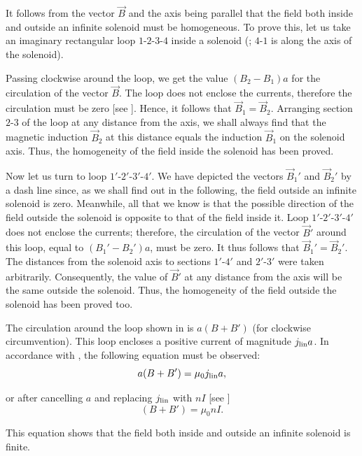 It follows from the vector $\vec{B}$ and the axis being parallel that the field both inside and outside an infinite solenoid must be homogeneous. To prove this, let us take an imaginary rectangular loop $1$-$2$-$3$-$4$ inside a solenoid (; $4$-$1$ is along the axis of the solenoid).

Passing clockwise around the loop, we get the value $(B_2 - B_1)a$ for the circulation of the vector $\vec{B}$. The loop does not enclose the currents, therefore the circulation must be zero [see ]. Hence, it follows that $\vec{B}_1 = \vec{B}_2$. Arranging section $2$-$3$ of the loop at
any distance from the axis, we shall always find that the magnetic induction $\vec{B}_2$ at this distance equals the induction $\vec{B}_1$ on the solenoid axis. Thus, the homogeneity of the field inside the solenoid has been proved.

Now let us turn to loop $1'$-$2'$-$3'$-$4'$. We have depicted the vectors $\vec{B}_1'$ and $\vec{B}_2'$ by a dash line since, as we shall find out in the following, the field outside an infinite solenoid is zero. Meanwhile, all that we know is that the possible direction of the field outside the solenoid is opposite to that of the field inside it. Loop $1'$-$2'$-$3'$-$4'$ does not enclose the currents; therefore, the circulation of the vector $\vec{B}'$ around this loop, equal to $(B_1' - B_2')a$, must be zero. It thus follows that $\vec{B}_1'=\vec{B}_2'$.
The distances from the solenoid axis to sections $1'$-$4'$ and $2'$-$3'$ were taken arbitrarily. Consequently, the value of $\vec{B}'$ at any distance from the axis will be the same outside the solenoid. Thus, the homogeneity of the field outside the solenoid has been proved too.

The circulation around the loop shown in  is $a(B+B')$ (for clockwise circumvention). This loop encloses a positive current of magnitude $j_{\text{lin}}a$. In accordance with , the following equation must be observed:
\begin{equation*}
    a(B+B') = \mu_0 j_{\text{lin}} a,
\end{equation*}

\noindent
or after cancelling $a$ and replacing $j_{\text{lin}}$ with $nI$ [see ]
\begin{equation}\label{eq:6_107}
    (B+B') = \mu_0 n I.
\end{equation}

\noindent
This equation shows that the field both inside and outside an infinite solenoid is finite.

